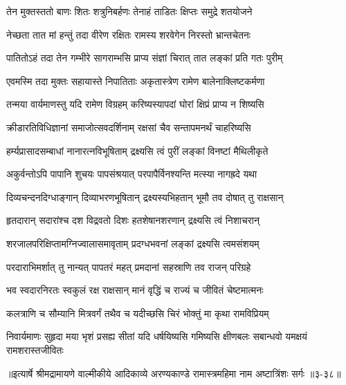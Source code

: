 \twolineshloka
{तेन मुक्तस्ततो बाणः शितः शत्रुनिबर्हणः}
{तेनाहं ताडितः क्षिप्तः समुद्रे शतयोजने} %

\twolineshloka
{नेच्छता तात मां हन्तुं तदा वीरेण रक्षितः}
{रामस्य शरवेगेन निरस्तो भ्रान्तचेतनः} %

\twolineshloka
{पातितोऽहं तदा तेन गम्भीरे सागराम्भसि}
{प्राप्य संज्ञां चिरात् तात लङ्कां प्रति गतः पुरीम्} %

\twolineshloka
{एवमस्मि तदा मुक्तः सहायास्ते निपातिताः}
{अकृतास्त्रेण रामेण बालेनाक्लिष्टकर्मणा} %

\twolineshloka
{तन्मया वार्यमाणस्तु यदि रामेण विग्रहम्}
{करिष्यस्यापदां घोरां क्षिप्रं प्राप्य न शिष्यसि} %

\twolineshloka
{क्रीडारतिविधिज्ञानां समाजोत्सवदर्शिनाम्}
{रक्षसां चैव सन्तापमनर्थं चाहरिष्यसि} %

\twolineshloka
{हर्म्यप्रासादसम्बाधां नानारत्नविभूषिताम्}
{द्रक्ष्यसि त्वं पुरीं लङ्कां विनष्टां मैथिलीकृते} %

\twolineshloka
{अकुर्वन्तोऽपि पापानि शुचयः पापसंश्रयात्}
{परपापैर्विनश्यन्ति मत्स्या नागह्रदे यथा} %

\twolineshloka
{दिव्यचन्दनदिग्धाङ्गान् दिव्याभरणभूषितान्}
{द्रक्ष्यस्यभिहतान् भूमौ तव दोषात् तु राक्षसान्} %

\twolineshloka
{हृतदारान् सदारांश्च दश विद्रवतो दिशः}
{हतशेषानशरणान् द्रक्ष्यसि त्वं निशाचरान्} %

\twolineshloka
{शरजालपरिक्षिप्तामग्निज्वालासमावृताम्}
{प्रदग्धभवनां लङ्कां द्रक्ष्यसि त्वमसंशयम्} %

\twolineshloka
{परदाराभिमर्शात् तु नान्यत् पापतरं महत्}
{प्रमदानां सहस्राणि तव राजन् परिग्रहे} %

\twolineshloka
{भव स्वदारनिरतः स्वकुलं रक्ष राक्षसान्}
{मानं वृद्धिं च राज्यं च जीवितं चेष्टमात्मनः} %

\twolineshloka
{कलत्राणि च सौम्यानि मित्रवर्गं तथैव च}
{यदीच्छसि चिरं भोक्तुं मा कृथा रामविप्रियम्} %

\twolineshloka
{निवार्यमाणः सुहृदा मया भृशं प्रसह्य सीतां यदि धर्षयिष्यसि}
{गमिष्यसि क्षीणबलः सबान्धवो यमक्षयं रामशरास्तजीवितः} %


॥इत्यार्षे श्रीमद्रामायणे वाल्मीकीये आदिकाव्ये अरण्यकाण्डे रामास्त्रमहिमा नाम अष्टात्रिंशः सर्गः ॥३-३८॥
